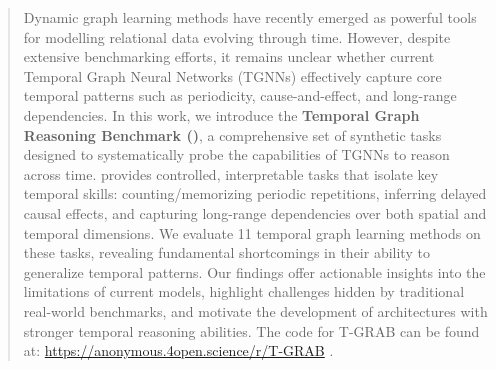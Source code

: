 \begin{abstract}

Dynamic graph learning methods have recently emerged as powerful tools for modelling relational data evolving through time. However, despite extensive benchmarking efforts, it remains unclear whether current Temporal Graph Neural Networks (TGNNs) effectively capture core temporal patterns such as periodicity, cause-and-effect, and long-range dependencies. In this work, we introduce the\textbf{ Temporal Graph Reasoning Benchmark (\benchmarkname)}, a comprehensive set of synthetic tasks designed to systematically probe the capabilities of TGNNs to reason across time. \benchmarkname provides controlled, interpretable tasks that isolate key temporal skills: counting/memorizing periodic repetitions, inferring delayed causal effects, and capturing long-range dependencies over both spatial and temporal dimensions. We evaluate 11 temporal graph learning methods on these tasks, revealing fundamental shortcomings in their ability to generalize temporal patterns. Our findings offer actionable insights into the limitations of current models, highlight challenges hidden by traditional real-world benchmarks, and motivate the development of architectures with stronger temporal reasoning abilities. The code for T-GRAB can be found at: 
\url{https://anonymous.4open.science/r/T-GRAB}
.
\end{abstract}
